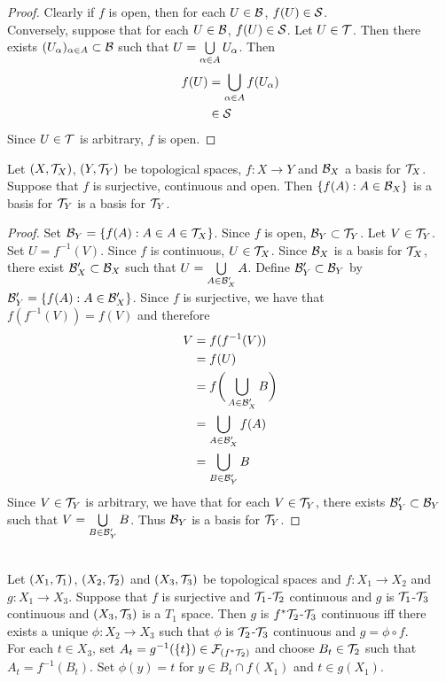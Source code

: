 \documentclass{book}
\begin{document}
	\begin{proof}
		Clearly if $f$ is open, then for each $U \in \mathcal{B}$, $f(U) \in \mathcal{S}$.\\
		Conversely, suppose that for each $U \in \mathcal{B}$, $f(U) \in \mathcal{S}$. Let $U \in \mathcal{T}$. Then there exists $(U_{\alpha})_{\alpha \in A} \subset \mathcal{B}$ such that $U =  \bigcup\limits_{\alpha \in A} U_{\alpha}$. Then 
		\begin{align*}
			f(U) 
			& = \bigcup\limits_{\alpha \in A} f(U_{\alpha}) \\
			& \in \mathcal{S}
		\end{align*}
		Since $U \in \mathcal{T}$ is arbitrary, $f$ is open.
	\end{proof}

	\begin{ex} 
		Let $(X, \mathcal{T}_X)$, $(Y, \mathcal{T}_Y)$ be topological spaces, $f:X \rightarrow Y$ and $\mathcal{B}_X$ a basis for $\mathcal{T}_X$.  Suppose that $f$ is surjective, continuous and open. Then $\{f(A): A \in \mathcal{B}_X\}$ is a basis for $\mathcal{T}_Y$ is a basis for $\mathcal{T}_Y$.
	\end{ex}
	
	\begin{proof}
		Set $\mathcal{B}_{Y} = \{f(A):A \in A \in \mathcal{T}_X\}$. Since $f$ is open, $\mathcal{B}_{Y} \subset \mathcal{T}_Y$. Let $V \in \mathcal{T}_Y$. Set $U = f^{-1}(V)$. Since $f$ is continuous, $U \in \mathcal{T}_X$. Since $\mathcal{B}_X$ is a basis for $\mathcal{T}_X$, there exist $\mathcal{B}_X' \subset \mathcal{B}_X$ such that $U = \bigcup\limits_{A \in \mathcal{B}_X'}A$. Define $\mathcal{B}_Y' \subset \mathcal{B}_Y$ by $\mathcal{B}_Y' = \{f(A): A \in \mathcal{B}_X'\}$. Since $f$ is surjective, we have that $f(f^{-1}(V)) = f(V)$ and therefore
		\begin{align*}
			V
			& = f(f^{-1}(V)) \\
			& = f(U) \\
			& = f \bigg( \bigcup_{A \in \mathcal{B}_X'} B \bigg) \\
			& = \bigcup_{A \in \mathcal{B}_X'} f(A) \\
			& = \bigcup_{B \in \mathcal{B}_Y'} B \\
		\end{align*} 
		Since $V \in \mathcal{T}_Y$ is arbitrary, we have that for each $V \in \mathcal{T}_Y$, there exists $\mathcal{B}_Y' \subset \mathcal{B}_Y$ such that $V = \bigcup\limits_{B \in \mathcal{B}_Y'} B$. Thus $\mathcal{B}_Y$ is a basis for $\mathcal{T}_Y$.
	\end{proof}
	
	\begin{ex}   \\
	Let $(X_1, \mathcal{T}_1)$, $(X_2, \mathcal{T}_2)$ and $(X_3, \mathcal{T}_3)$ be topological spaces and $f: X_1 \rightarrow X_2$ and $g:X_1 \rightarrow X_3$. Suppose that $f$ is surjective and $\mathcal{T}_1$-$\mathcal{T}_2$ continuous and $g$ is $\mathcal{T}_1$-$\mathcal{T}_3$ continuous and $(X_3, \mathcal{T}_3)$ is a $T_1$ space. Then $g$ is $f^*\mathcal{T}_2$-$\mathcal{T}_3$ continuous iff there exists a unique $\phi: X_2 \rightarrow X_3$ such that $\phi$ is $\mathcal{T}_2$-$\mathcal{T}_3$ continuous and $g = \phi \circ f$. \\
	 For each $t \in X_3$, set $A_t = g^{-1}(\{t\}) \in \mathcal{F}_{(f^* \mathcal{T}_2)}$ and choose $B_t \in \mathcal{T}_2$ such that $A_t = f^{-1}(B_t)$. Set $\phi(y) = t$ for $y \in B_t \cap f(X_1)$ and $t \in g(X_1)$.
	\end{ex}
	
\end{document}
